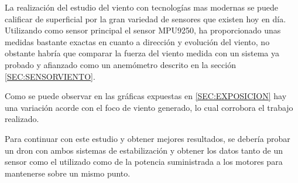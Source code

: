 
La realización del estudio del viento con tecnologías mas modernas se puede calificar de superficial por la gran variedad de sensores que existen hoy en día. Utilizando como sensor principal el sensor MPU9250, ha proporcionado unas medidas bastante exactas en cuanto a dirección y evolución del viento, no obstante habría que comparar la fuerza del viento medida con un sistema ya probado y afianzado como un anemómetro descrito en la sección \ref{SEC:SENSORVIENTO}. 

Como se puede observar en las gráficas expuestas en \ref{SEC:EXPOSICION} hay una variación acorde con el foco de viento generado, lo cual corrobora el trabajo realizado.

Para continuar con este estudio y obtener mejores resultados, se debería probar un dron con ambos sistemas de estabilización y obtener los datos tanto de un sensor como el utilizado como de la potencia suministrada a los motores para mantenerse sobre un mismo punto. 